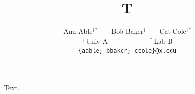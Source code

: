 \documentclass{article}
\title{T}
\author{Ann Able$^\dagger$$^\ast$ ~ ~ Bob Baker$^\dagger$ ~ ~ Cat Cole$^\dagger$$^\ast$\\
$^\dagger$\,Univ A ~ ~ ~ ~ ~ ~ ~ $^\ast$\,Lab B\\
{\tt\small \{aable; bbaker; ccole\}@x.edu}}
\begin{document}
\maketitle
Text.
\end{document}
